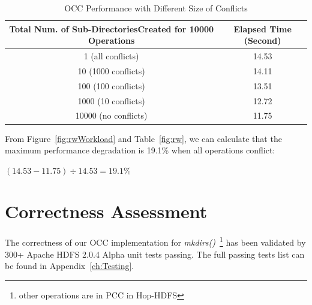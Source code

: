 \begin{table}[h]
	\centering
\begin{tabular}{|c|c|}
	\hline
	\textbf{Total Num. of Sub-DirectoriesCreated for 10000 Operations} & \textbf{Elapsed Time (Second)} \\ \hline
	1 (all conflicts)                                                  & 14.53                          \\ \hline
	10 (1000 conflicts)                                                & 14.11                          \\ \hline
	100 (100 conflicts)                                                & 13.51                          \\ \hline
	1000 (10 conflicts)                                                & 12.72                          \\ \hline
	10000 (no conflicts)                                               & 11.75                          \\ \hline
\end{tabular}
	\caption{OCC Performance with Different Size of Conflicts}
	\label{table:conflicts}
\end{table}

\noindent From Figure~\ref{fig:rwWorkload} and Table~\ref{fig:rw}, we can calculate that the maximum performance degradation is 19.1\% when all operations conflict:
\begin{center}
	$(14.53-11.75) \div 14.53 = 19.1\%$
\end{center}

\section{Correctness Assessment}

The correctness of our OCC implementation for \textit{mkdirs()}~\footnote{other operations are in PCC in Hop-HDFS} has been validated by 300+ Apache HDFS 2.0.4 Alpha unit tests passing. The full passing tests list can be found in Appendix~\ref{ch:Testing}.
